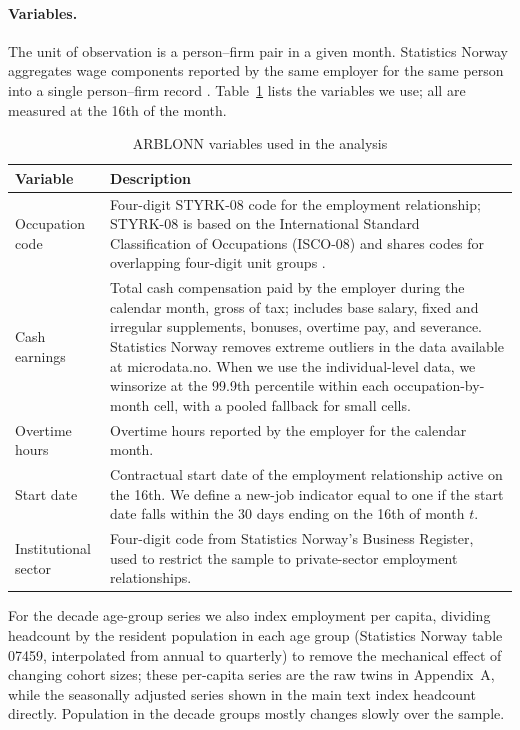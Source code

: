 \documentclass[12pt]{article}
\begin{document}
\paragraph{Variables.}
The unit of observation is a person--firm pair in a given month. Statistics Norway aggregates wage components reported by the same employer for the same person into a single person--firm record \citep{ssb_klassifisering}. Table~\ref{tab:arblonn_variables} lists the variables we use; all are measured at the 16th of the month.

\begin{table}[htbp]
\centering
\caption{ARBLONN variables used in the analysis}
\label{tab:arblonn_variables}
\footnotesize
\begin{tabular}{p{4.2cm}p{10cm}}
\toprule
Variable & Description \\
\midrule
Occupation code & Four-digit STYRK-08 code for the employment relationship; STYRK-08 is based on the International Standard Classification of Occupations (ISCO-08) and shares codes for overlapping four-digit unit groups \citep{ssb2011styrk}. \\[4pt]
Cash earnings & Total cash compensation paid by the employer during the calendar month, gross of tax; includes base salary, fixed and irregular supplements, bonuses, overtime pay, and severance. Statistics Norway removes extreme outliers in the data available at microdata.no. When we use the individual-level data, we winsorize at the 99.9th percentile within each occupation-by-month cell, with a pooled fallback for small cells. \\[4pt]
Overtime hours & Overtime hours reported by the employer for the calendar month. \\[4pt]
Start date & Contractual start date of the employment relationship active on the 16th. We define a new-job indicator equal to one if the start date falls within the 30 days ending on the 16th of month $t$. \\[4pt]
Institutional sector & Four-digit code from Statistics Norway's Business Register, used to restrict the sample to private-sector employment relationships. \\
\bottomrule
\end{tabular}
\end{table}

For the decade age-group series we also index employment per capita, dividing headcount by the resident population in each age group (Statistics Norway table 07459, interpolated from annual to quarterly) to remove the mechanical effect of changing cohort sizes; these per-capita series are the raw twins in Appendix~A, while the seasonally adjusted series shown in the main text index headcount directly. Population in the decade groups mostly changes slowly over the sample.
\end{document}
